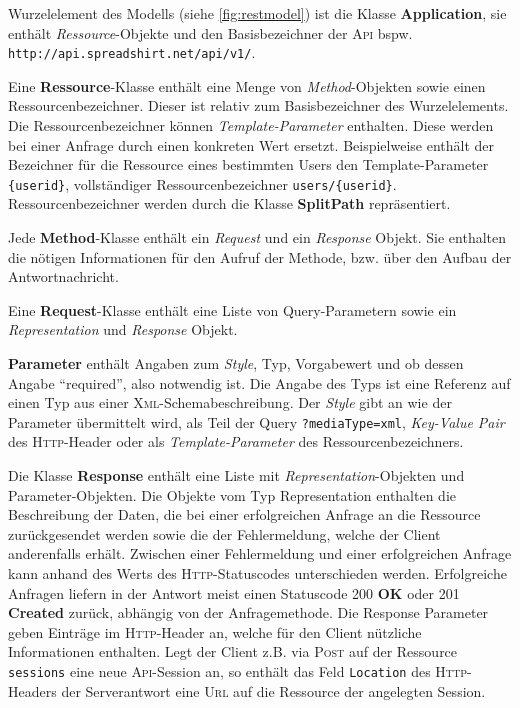 Wurzelelement des Modells (siehe \cref{fig:restmodel}) ist die Klasse \textbf{Application}, sie enthält \emph{Ressource}-Objekte und den Basisbezeichner der \textsc{Api} bspw. \texttt{\small http://api.spreadshirt.net/api/v1/}. 

Eine \textbf{Ressource}-Klasse enthält eine Menge von \emph{Method}-Objekten sowie einen Ressourcenbezeichner. Dieser ist relativ zum Basisbezeichner des Wurzelelements. Die Ressourcenbezeichner können \emph{Template-Parameter} enthalten. Diese werden bei einer Anfrage durch einen konkreten Wert ersetzt. Beispielweise enthält der Bezeichner für die Ressource eines bestimmten Users den Template-Parameter \texttt{\{userid\}}, vollständiger Ressourcenbezeichner \texttt{users/\{userid\}}. Ressourcenbezeichner werden durch die Klasse \textbf{SplitPath} repräsentiert. 

Jede \textbf{Method}-Klasse enthält ein \emph{Request} und ein \emph{Response} Objekt. Sie enthalten die nötigen Informationen für den Aufruf der Methode, bzw. über den Aufbau der Antwortnachricht.

Eine \textbf{Request}-Klasse enthält eine Liste von Query-Parametern sowie ein \emph{Representation} und \emph{Response} Objekt.

\textbf{Parameter} enthält Angaben zum \emph{Style}, Typ, Vorgabewert und ob dessen Angabe \enquote{required}, also notwendig ist. Die Angabe des Typs ist eine Referenz auf einen Typ aus einer \textsc{Xml}-Schemabeschreibung. Der \emph{Style} gibt an wie der Parameter übermittelt wird, als Teil der Query \texttt{?mediaType=xml}, \emph{Key-Value Pair} des \textsc{Http}-Header oder als \emph{Template-Parameter} des Ressourcenbezeichners. 

Die Klasse \textbf{Response} enthält eine Liste mit \emph{Representation}-Objekten und Parameter-Objekten. Die Objekte vom Typ Representation enthalten die Beschreibung der Daten, die bei einer erfolgreichen Anfrage an die Ressource zurückgesendet werden sowie die der Fehlermeldung, welche der Client anderenfalls erhält. Zwischen einer Fehlermeldung und einer erfolgreichen Anfrage kann anhand des Werts des \textsc{Http}-Statuscodes unterschieden werden. Erfolgreiche Anfragen liefern in der Antwort meist einen Statuscode 200 \textbf{OK} oder 201 \textbf{Created} zurück, abhängig von der Anfragemethode. Die Response Parameter geben Einträge im \textsc{Http}-Header an, welche für den Client nützliche Informationen enthalten. Legt der Client z.B. via \textsc{Post} auf der Ressource \texttt{sessions} eine neue \textsc{Api}-Session an, so enthält das Feld \texttt{Location} des \textsc{Http}-Headers der Serverantwort eine \textsc{Url} auf die Ressource der angelegten Session.

